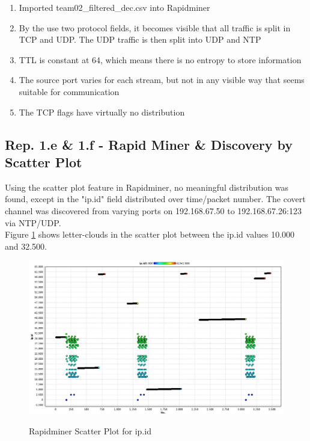 \documentclass{article}
\begin{document}
\begin{enumerate}
	\item Imported team02\_filtered\_dec.csv into Rapidminer
	\item By the use two protocol fields, it becomes visible that all traffic is split in TCP and UDP. The UDP traffic is then split into UDP and NTP
	\item TTL is constant at 64, which means there is no entropy to store information
	\item The source port varies for each stream, but not in any visible way that seems suitable for communication
	\item The TCP flags have virtually no distribution
\end{enumerate} 

\subsection*{Rep. 1.e \& 1.f - Rapid Miner \& Discovery by Scatter Plot}
Using the scatter plot feature in Rapidminer, no meaningful distribution was found, except in the "ip.id" field distributed over time/packet number. The covert channel was discovered from varying ports on 192.168.67.50 to 192.168.67.26:123 via NTP/UDP.\\

Figure \ref{fig:RMscreen} shows letter-clouds in the scatter plot between the ip.id values 10.000 and 32.500.
\begin{figure}[H] 
	\centering %
	{\includegraphics[width=\textwidth]{images/RMscreen.png}} %
	\caption{Rapidminer Scatter Plot for ip.id} 
	\label{fig:RMscreen} %
\end{figure} 
\end{document}
